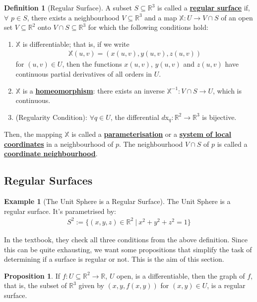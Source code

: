 \documentclass[11pt]{scrartcl}
\newcommand{\R}[0]{\mathbb{R}}
\theoremstyle{definition}
\newtheorem{definition}{Definition}
\newtheorem{prop}{Proposition}
\newtheorem{ex}{Example}
\theoremstyle{remark}
\newcommand{\dfn}[1]{\textbf{\underline{#1}}}
\begin{document}
{\begin{definition}[Regular Surface]
	A subset $S \subseteq \R^3$ is called a \dfn{regular surface} if, $\forall$ $p \in S$, there exists a neighbourhood $V \subseteq \R^3$ and a map $\mathbb{X}: U \rightarrow V \cap S$ of an open set $V \subseteq \R^2$ onto $V \cap S \subseteq \R^3$ for which the following conditions hold: 
	\begin{enumerate}[noitemsep]
		\item $\mathbb{X}$ is differentiable; that is, if we write 
		\begin{align*}
			\mathbb{X}(u,v) = (x(u,v), y(u,v), z(u,v)) 
		\end{align*} 
		for $(u,v) \in U$, then the functions $x(u,v)$, $y(u,v)$ and $z(u,v)$ have continuous partial derivatives of all orders in $U$. 
		\item $\mathbb{X}$ is a \dfn{homeomorphism}: there exists an inverse $\mathbb{X}^{-1}: V \cap S \rightarrow U$, which is continuous. 
		\item (Regularity Condition): $\forall q \in U$, the differential $d$x$_q: \R^2 \rightarrow \R^3$ is bijective. 
	\end{enumerate}
	Then, the mapping $\mathbb{X}$ is called a \dfn{parameterisation}  or a \dfn{system of local coordinates} in a neighbourhood of $p$. The neighbourhood $V \cap S$ of $p$ is called a \dfn{coordinate neighbourhood}. 
\end{definition}


\subsection{Regular Surfaces}
\begin{ex}[The Unit Sphere is a Regular Surface] 
	The Unit Sphere is a regular surface. It's parametrised by: 
	\begin{align*}
		S^2 := \{ (x,y,z) \in \R^2\ |\ x^2 + y^2 + z^2 = 1 \} 
	\end{align*}
\end{ex}
In the textbook, they check all three conditions from the above definition. Since this can be quite exhausting, we want some propositions that simplify the task of determining if a surface is regular or not. This is the aim of this section. 

\begin{prop}
	If $f: U \subseteq \R^2 \rightarrow \R$, $U$ open, is a differentiable, then the graph of $f$, that is, the subset of $\R^3$ given by $(x,y, f(x,y))$ for $(x,y) \in U$, is a regular surface. 
\end{prop}

}
\end{document}
